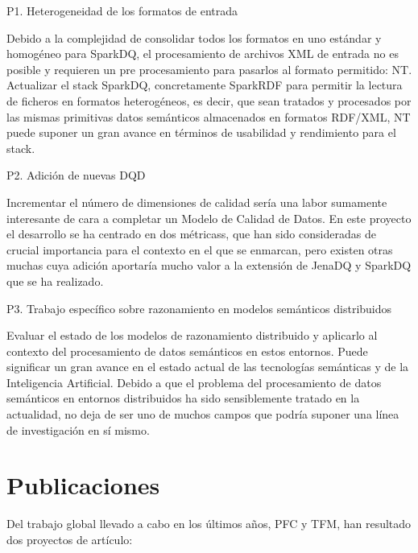 \begin{definitionlist}

\item[P1. Heterogeneidad de los formatos de entrada]

Debido a la complejidad de consolidar todos los
formatos en uno estándar y homogéneo para SparkDQ, el procesamiento de archivos
\acs{XML} de entrada no es posible y requieren un pre procesamiento para
pasarlos al formato permitido: \acs{NT}. Actualizar el stack SparkDQ, concretamente SparkRDF para permitir la lectura de
ficheros en formatos heterogéneos, es decir, que sean tratados y procesados por
las mismas primitivas datos semánticos almacenados en formatos
\acs{RDF}/\acs{XML}, \acs{NT} puede suponer un gran avance en términos de
usabilidad y rendimiento para el stack. 


\item[P2. Adición de nuevas \acs{DQD}]

Incrementar el número de dimensiones de calidad sería una labor sumamente
interesante de cara a completar un Modelo de Calidad de Datos. En este proyecto
el desarrollo se ha centrado en dos métricass, que han sido consideradas de
crucial importancia para el contexto en el que se enmarcan, pero existen otras
muchas cuya adición aportaría mucho valor a la extensión de JenaDQ y SparkDQ que se ha
realizado. 

\item[P3. Trabajo específico sobre razonamiento en modelos semánticos
  distribuidos]

Evaluar el estado de los modelos de razonamiento distribuido y aplicarlo al
contexto del procesamiento de datos semánticos en estos entornos. Puede
significar un gran avance en el estado actual de las tecnologías semánticas y de
la Inteligencia Artificial. Debido a que el problema del procesamiento de datos
semánticos en entornos distribuidos ha sido sensiblemente tratado en la
actualidad, no deja de ser uno de muchos campos que podría suponer una línea de
investigación en sí mismo. 

\end{definitionlist}

\section{Publicaciones}

Del trabajo global llevado a cabo en los últimos años, \acs{PFC} y \acs{TFM},
han resultado dos proyectos de artículo: 

